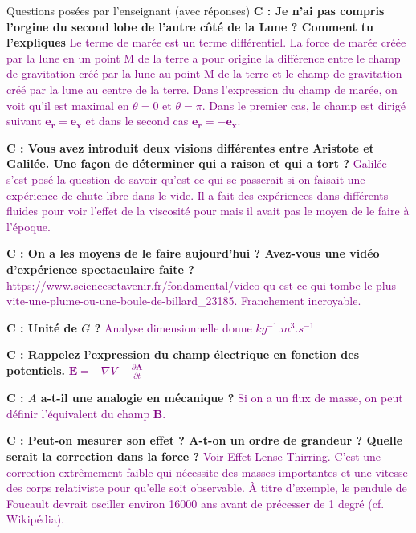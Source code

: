 \begin{reportBlock}{Questions posées par l’enseignant (avec réponses)}
  \textbf{C : Je n'ai pas compris l'orgine du second lobe de l'autre côté de la Lune ? Comment tu l'expliques}  \textcolor{purple}{Le terme de marée est un terme différentiel. La force de marée créée par la lune en un point M de la terre a pour origine la différence entre le champ de gravitation créé par la lune au point M de la terre et le champ de gravitation créé par la lune au centre de la terre. Dans l'expression du champ de marée, on voit qu'il est maximal en $\theta=0$ et $\theta=\pi$. Dans le premier cas, le champ est dirigé suivant $\mathbf{e_r}=\mathbf{e_x}$ et dans le second cas $\mathbf{e_r}=-\mathbf{e_x}$.}\newline
  
  \textbf{C : Vous avez introduit deux visions différentes entre Aristote et Galilée. Une façon de déterminer qui a raison et qui a tort ?}  \textcolor{purple}{Galilée s'est posé la question de savoir qu'est-ce qui se passerait si on faisait une expérience de chute libre dans le vide. Il a fait des expériences dans différents fluides pour voir l'effet de la viscosité pour mais il avait pas le moyen de le faire à l'époque.}\newline
  
  \textbf{C : On a les moyens de le faire aujourd'hui ? Avez-vous une vidéo d'expérience spectaculaire faite ?}  \textcolor{purple}{https://www.sciencesetavenir.fr/fondamental/video-qu-est-ce-qui-tombe-le-plus-vite-une-plume-ou-une-boule-de-billard\_23185. Franchement incroyable.}\newline
  
  \textbf{C : Unité de $G$ ?}  \textcolor{purple}{Analyse dimensionnelle donne $kg^{-1}.m^3.s^{-1}$}\newline
    
  \textbf{C : Rappelez l'expression du champ électrique en fonction des potentiels.}  \textcolor{purple}{$\mathbf E = - \nabla V - \frac{\partial \mathbf A}{\partial t}$}\newline
    
  \textbf{C : $A$ a-t-il une analogie en mécanique ?}  \textcolor{purple}{Si on a un flux de masse, on peut définir l'équivalent du champ $\mathbf B$.}\newline
    
  \textbf{C : Peut-on mesurer son effet ? A-t-on un ordre de grandeur ? Quelle serait la correction dans la force ?}  \textcolor{purple}{Voir Effet Lense-Thirring. C'est une correction extrêmement faible qui nécessite des masses importantes et une vitesse des corps relativiste pour qu'elle soit observable. À titre d'exemple, le pendule de Foucault devrait osciller environ 16000 ans avant de précesser de 1 degré (cf. Wikipédia).}\newline
    

\end{reportBlock}

